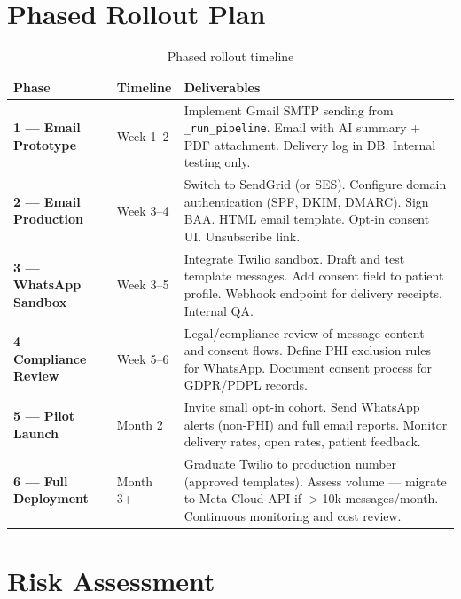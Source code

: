 \documentclass[12pt,a4paper]{article}
\newcommand{\codeinline}[1]{\texttt{\small\color{accent}#1}}
\begin{document}
\section{Phased Rollout Plan}

\begin{table}[h!]
\centering
\begin{tabularx}{\linewidth}{l l X}
\toprule
\textbf{Phase} & \textbf{Timeline} & \textbf{Deliverables} \\
\midrule
\rowcolor{rowA}
\textbf{1 --- Email Prototype} & Week 1--2 &
    Implement Gmail SMTP sending from \codeinline{\_run\_pipeline}.
    Email with AI summary + PDF attachment. Delivery log in DB.
    Internal testing only. \\
\textbf{2 --- Email Production} & Week 3--4 &
    Switch to SendGrid (or SES). Configure domain authentication
    (SPF, DKIM, DMARC). Sign BAA. HTML email template. Opt-in
    consent UI. Unsubscribe link. \\
\rowcolor{rowA}
\textbf{3 --- WhatsApp Sandbox} & Week 3--5 &
    Integrate Twilio sandbox. Draft and test template messages.
    Add consent field to patient profile. Webhook endpoint for
    delivery receipts. Internal QA. \\
\textbf{4 --- Compliance Review} & Week 5--6 &
    Legal/compliance review of message content and consent flows.
    Define PHI exclusion rules for WhatsApp. Document consent
    process for GDPR/PDPL records. \\
\rowcolor{rowA}
\textbf{5 --- Pilot Launch} & Month 2 &
    Invite small opt-in cohort. Send WhatsApp alerts (non-PHI) and
    full email reports. Monitor delivery rates, open rates,
    patient feedback. \\
\textbf{6 --- Full Deployment} & Month 3+ &
    Graduate Twilio to production number (approved templates).
    Assess volume --- migrate to Meta Cloud API if $>$10k messages/month.
    Continuous monitoring and cost review. \\
\bottomrule
\end{tabularx}
\caption{Phased rollout timeline}
\end{table}

\section{Risk Assessment}
\end{document}
